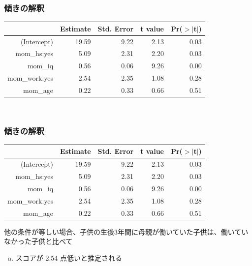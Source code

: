 
\begin{frame}
\frametitle{傾きの解釈}


{\small
\begin{center}
\begin{tabular}{rrrrr}
  \hline
 & Estimate & Std. Error & t value & Pr($>$$|$t$|$) \\
  \hline
(Intercept) & 19.59 & 9.22 & 2.13 & 0.03 \\
  mom\_hs:yes & 5.09 & 2.31 & 2.20 & 0.03 \\
  mom\_iq & 0.56 & 0.06 & 9.26 & 0.00 \\
  mom\_work:yes & 2.54 & 2.35 & 1.08 & 0.28 \\
  mom\_age & 0.22 & 0.33 & 0.66 & 0.51 \\
   \hline
\end{tabular}
\end{center}
}

$\:$ \\


\end{frame}


\begin{frame}
\frametitle{傾きの解釈}


{\scriptsize
\begin{center}
\begin{tabular}{rrrrr}
  \hline
 & Estimate & Std. Error & t value & Pr($>$$|$t$|$) \\
  \hline
(Intercept) & 19.59 & 9.22 & 2.13 & 0.03 \\
  mom\_hs:yes & 5.09 & 2.31 & 2.20 & 0.03 \\
  mom\_iq & 0.56 & 0.06 & 9.26 & 0.00 \\
  mom\_work:yes & 2.54 & 2.35 & 1.08 & 0.28 \\
  mom\_age & 0.22 & 0.33 & 0.66 & 0.51 \\
   \hline
\end{tabular}
\end{center}
}

他の条件が等しい場合、子供の生後3年間に母親が働いていた子供は、働いていなかった子供と比べて
\begin{enumerate}[(a)]
\item スコアが 2.54 点低いと推定される
\end{enumerate}

\end{frame}

